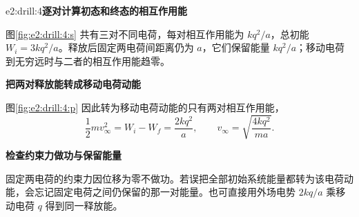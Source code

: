 \begin{drillsolution}{e2:drill:4}\textbf{逐对计算初态和终态的相互作用能}\par\nobreak
图\ref{fig:e2:drill:4:s} 共有三对不同电荷，每对相互作用能为 $kq^2/a$，总初能 $W_i=3kq^2/a$。释放后固定两电荷间距离仍为 $a$，它们保留能量 $kq^2/a$；移动电荷到无穷远时与二者的相互作用能趋零。



\par\medskip{}\noindent\textbf{把两对释放能转成移动电荷动能}\par\nobreak
图\ref{fig:e2:drill:4:p} 因此转为移动电荷动能的只有两对相互作用能，
\[
 \frac12mv_\infty^2=W_i-W_f=\frac{2kq^2}{a},
 \qquad v_\infty=\sqrt{\frac{4kq^2}{ma}}.
\]


\par\medskip{}\noindent\textbf{检查约束力做功与保留能量}\par\nobreak
固定两电荷的约束力因位移为零不做功。若误把全部初始系统能量都转为该电荷动能，会忘记固定电荷之间仍保留的那一对能量。也可直接用外场电势 $2kq/a$ 乘移动电荷 $q$ 得到同一释放能。\end{drillsolution}
